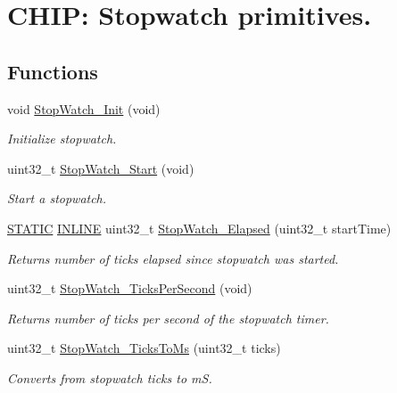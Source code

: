 \hypertarget{group___stop___watch}{}\section{C\+H\+IP\+: Stopwatch primitives.}
\label{group___stop___watch}
\subsection*{Functions}
\begin{DoxyCompactItemize}
\item 
void \hyperlink{group___stop___watch_gaa0f8ea277b700d20b4322a15d9ddf32c}{Stop\+Watch\+\_\+\+Init} (void)
\begin{DoxyCompactList}\small\item\em Initialize stopwatch. \end{DoxyCompactList}\item 
uint32\+\_\+t \hyperlink{group___stop___watch_ga0dbab611d6cbdd4faad5018131aca140}{Stop\+Watch\+\_\+\+Start} (void)
\begin{DoxyCompactList}\small\item\em Start a stopwatch. \end{DoxyCompactList}\item 
\hyperlink{group___l_p_c___types___public___macros_ga10b2d890d871e1489bb02b7e70d9bdfb}{S\+T\+A\+T\+IC} \hyperlink{spifi__18xx__43xx_8h_a2eb6f9e0395b47b8d5e3eeae4fe0c116}{I\+N\+L\+I\+NE} uint32\+\_\+t \hyperlink{group___stop___watch_ga0a0b6b9a4391ae5f4fcccb22a2a35f73}{Stop\+Watch\+\_\+\+Elapsed} (uint32\+\_\+t start\+Time)
\begin{DoxyCompactList}\small\item\em Returns number of ticks elapsed since stopwatch was started. \end{DoxyCompactList}\item 
uint32\+\_\+t \hyperlink{group___stop___watch_gae780d65d75ed3ca6dbd33389479eed9f}{Stop\+Watch\+\_\+\+Ticks\+Per\+Second} (void)
\begin{DoxyCompactList}\small\item\em Returns number of ticks per second of the stopwatch timer. \end{DoxyCompactList}\item 
uint32\+\_\+t \hyperlink{group___stop___watch_gab62ee68f7b01b5c14b0d19c3c391ca02}{Stop\+Watch\+\_\+\+Ticks\+To\+Ms} (uint32\+\_\+t ticks)
\begin{DoxyCompactList}\small\item\em Converts from stopwatch ticks to mS. \end{DoxyCompactList}\item 

\end{DoxyCompactItemize}
